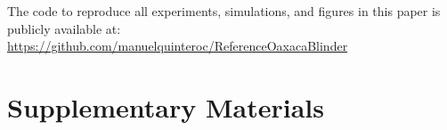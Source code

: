\documentclass{article}
\theoremstyle{definition}
\begin{document}
The code to reproduce all experiments, simulations, and figures in this paper is publicly available at: \url{https://github.com/manuelquinteroc/ReferenceOaxacaBlinder}




\clearpage
\appendix
\onecolumn

\section*{Supplementary Materials}




\end{document}
